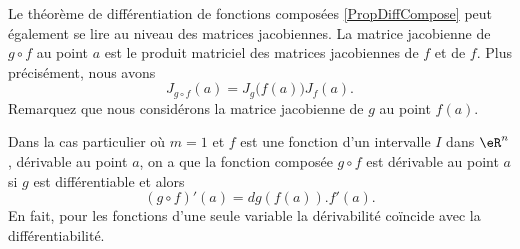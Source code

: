 \begin{normaltext}
	Le théorème de différentiation de fonctions composées \ref{PropDiffCompose} peut également se lire au niveau des matrices jacobiennes. La matrice jacobienne de \( g\circ f\) au point \( a\) est le produit matriciel des matrices jacobiennes de \( f\) et de \( f\). Plus précisément, nous avons
	\begin{equation}
		J_{g\circ f}(a)=J_g\big( f(a) \big)J_f(a).
	\end{equation}
	Remarquez que nous considérons la matrice jacobienne de \( g\) au point \( f(a)\).

	Dans la cas particulier où \( m=1\) et \( f\) est une fonction d'un intervalle \( I\) dans \( \eR^n\), dérivable au point \( a\), on a que la fonction composée \( g\circ f\) est dérivable au point \( a\) si \( g\) est différentiable et alors
	\[
		(g\circ f)'(a)= dg\left(f(a)\right).f'(a).
	\]
	En fait, pour les fonctions d'une seule variable la dérivabilité coïncide avec la différentiabilité.
\end{normaltext}

